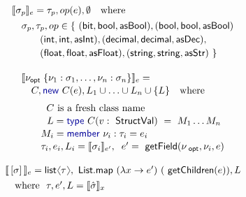\documentclass[preprint]{sigplanconf}
\newcommand{\langl}{\begin{picture}(4.5,7)
\put(1.1,2.5){\rotatebox{60}{\line(1,0){5.5}}}
\put(1.1,2.5){\rotatebox{300}{\line(1,0){5.5}}}
\end{picture}}
\newcommand{\rangl}{\begin{picture}(4.5,7)
\put(.9,2.5){\rotatebox{120}{\line(1,0){5.5}}}
\put(.9,2.5){\rotatebox{240}{\line(1,0){5.5}}}
\end{picture}}
\newcommand{\kvd}[1]{\textnormal{\textcolor{kvdclr}{\sffamily #1}}}
\newcommand{\ident}[1]{\textnormal{\sffamily #1}}
\newcommand{\sem}[1]{\llbracket #1 \rrbracket}
\begin{document}
\begin{figure}
\begin{multicols}{2}
\noindent
\begin{equation*}
\begin{array}{l}
 \sem{\sigma_p}_e = \tau_p,op(e),\emptyset\quad\textnormal{where} \\[0.4em]
\quad\sigma_p, \tau_p, op\in  \{~ (\ident{bit}, \ident{bool}, \ident{asBool}),  (\ident{bool}, \ident{bool}, \ident{asBool})\\[0.2em]
\hspace{2.9em} (\ident{int}, \ident{int}, \ident{asInt}), (\ident{decimal},\ident{decimal},\ident{asDec}),\\[0.2em]
\hspace{2.9em} (\ident{float},\ident{float},\ident{asFloat}), (\ident{string},\ident{string},\ident{asStr}) ~\}\\[0.6em]
\end{array}
\end{equation*}
%
\begin{equation*}
\begin{array}{l}
 \sem{\nu_{\ident{opt}}\; \{ \nu_1 : \sigma_1, \ldots, \nu_n : \sigma_n \}}_e = \\[0.1em]
 \quad C, \kvd{new}~C(e), L_1\cup\ldots\cup L_n\cup\{ L \}\quad\textnormal{where}\\[0.6em]
 \qquad \;\;C~\textnormal{is a fresh class name} \\[0.1em]
 \qquad \;\,\,L = \kvd{type}~C(v:\ident{StructVal})~=~M_1\ldots M_n  \\[0.1em]
 \qquad M_i = \kvd{member}~\nu_i:\tau_i=e_i\\[0.1em]
 \qquad \tau_i, e_i, L_i = \sem{\sigma_i}_{e'},\;\; e'=\ident{getField}(\nu_{\ident{opt}}, \nu_i, e)\\[0.6em]
\end{array}
\end{equation*}
%
\begin{equation*}
\begin{array}{l}
 \sem{\,[\sigma]\,}_e = \ident{list}\langl\tau\rangl, \ident{List.map}~(\lambda x\rightarrow e')~(\ident{getChildren}(e)), L\\[0.4em]
 \quad \textnormal{where}~~\tau, e', L = \sem{\hat{\sigma}}_x
\end{array}
\end{equation*}


\end{multicols}
\end{figure}
\end{document}
